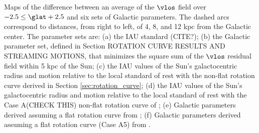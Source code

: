 \label{fig:six_pies}
Maps of the difference between an average of the $\vlos$ field over $-2.5 \leq \glat +2.5$ and six sets of Galactic parameters. The dashed arcs correspond to distances, from right to left, of 4, 8, and 12 kpc from the Galactic center. The parameter sets are: (a) the IAU standard (CITE?); (b) the Galactic parameter set, defined in Section ROTATION CURVE RESULTS AND STREAMING MOTIONS, that minimizes the square sum of the $\vlos$ residual field within 5 kpc of the Sun; (c) the IAU values of the Sun's galactocentric radius and motion relative to the local standard of rest with the non-flat rotation curve derived in Section \ref{sec:rotation_curve}; (d) the IAU values of the Sun's galactocentric radius and motion relative to the local standard of rest with the Case A(CHECK THIS) non-flat rotation curve of \citet{Clemens:1985dp}; (e) Galactic parameters derived assuming a flat rotation curve from \citet{Bovy_2012}; (f) Galactic parameters derived assuming a flat rotation curve (Case A5) from \citet{Reid:2014km}. 